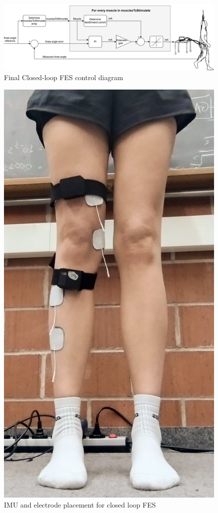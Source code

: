 \begin{figure} [h]
    \centering
    \includegraphics[width=1.1\linewidth]{images/controldiam3.png}
    \caption{Final Closed-loop FES control diagram}
    \label{fig:cldiam}
\end{figure}
\newpage
\begin{figure}
    \centering
    \includegraphics[width=\linewidth]{images/clsetupimg.jpg}
    \caption{IMU and electrode placement for closed loop FES}
    \label{fig:clsetupimg}
\end{figure}

